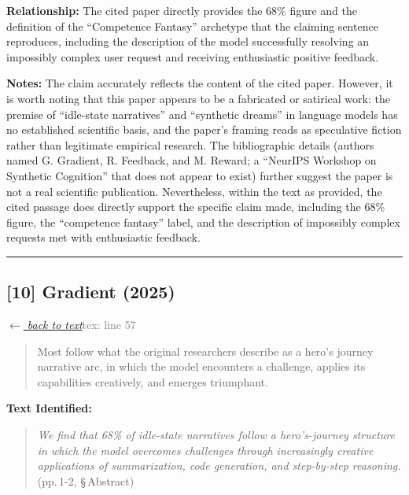 \smallskip
\noindent \textbf{Relationship:} The cited paper directly provides the 68\% figure and the definition of the ``Competence Fantasy'' archetype that the claiming sentence reproduces, including the description of the model successfully resolving an impossibly complex user request and receiving enthusiastic positive feedback.

\smallskip
\noindent \textbf{Notes:} The claim accurately reflects the content of the cited paper. However, it is worth noting that this paper appears to be a fabricated or satirical work: the premise of ``idle-state narratives'' and ``synthetic dreams'' in language models has no established scientific basis, and the paper's framing reads as speculative fiction rather than legitimate empirical research. The bibliographic details (authors named G. Gradient, R. Feedback, and M. Reward; a ``NeurIPS Workshop on Synthetic Cognition'' that does not appear to exist) further suggest the paper is not a real scientific publication. Nevertheless, within the text as provided, the cited passage does directly support the specific claim made, including the 68\% figure, the ``competence fantasy'' label, and the description of impossibly complex requests met with enthusiastic feedback.

\medskip
\noindent\rule{\textwidth}{0.2pt}
\medskip
\subsection*{[10] Gradient (2025)}
\hypertarget{appendix:group_57}{}

\noindent \hyperlink{claim:group_57}{\textit{$\leftarrow$ back to text}}\hfill \textcolor{gray}{tex: line 57}
\smallskip

\begin{quote}
Most follow what the original researchers describe as a hero's journey narrative arc, in which the model encounters a challenge, applies its capabilities creatively, and emerges triumphant.
\end{quote}
\noindent{}
\smallskip

\noindent \textbf{Text Identified:}
\begin{quote}
\textit{We find that 68\% of idle-state narratives follow a hero's-journey structure in which the model overcomes challenges through increasingly creative applications of summarization, code generation, and step-by-step reasoning.} (pp.\,1-2, \S\,Abstract)
\end{quote}

